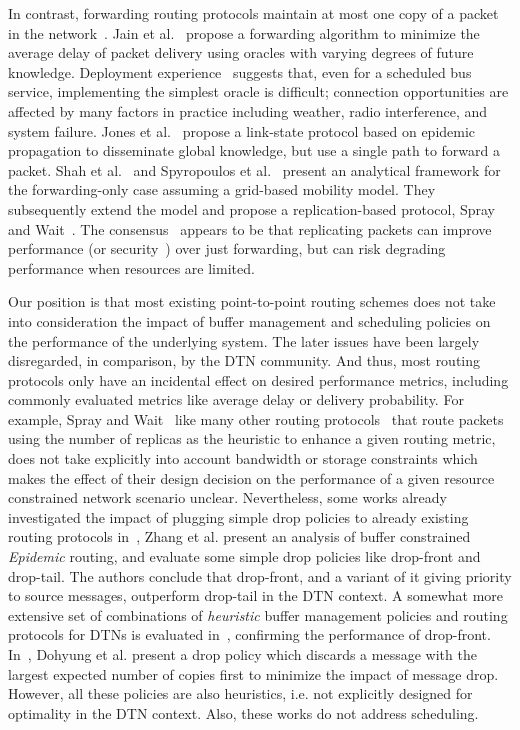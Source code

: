 In contrast, forwarding routing protocols maintain at most one copy of a packet in the network~\cite{Fall:DTNrouting,Waterloo:wdtn,akis:technical1}. Jain et
al.~\cite{Fall:DTNrouting} propose a forwarding algorithm to minimize the average delay of packet delivery using oracles with varying degrees of future knowledge. Deployment experience~\cite{BalasubramanianLV07} suggests that, even for a scheduled bus service, implementing
the simplest oracle is difficult; connection opportunities are affected by many factors in practice including weather, radio
interference, and system failure. Jones et al.~\cite{Waterloo:wdtn} propose a link-state protocol based on
epidemic propagation to disseminate global knowledge, but use a single path to forward a packet. Shah et al.~\cite{Shah:datamules} and
Spyropoulos et al.~\cite{akis:technical1} present an analytical framework for the forwarding-only case assuming a grid-based mobility model. They subsequently extend the model and propose a
replication-based protocol, Spray and Wait~\cite{akis:wdtn}. The consensus~\cite{akis:wdtn} appears to be that replicating packets can improve performance (or security~\cite{Levine:Mobihoc07}) over just forwarding, but can risk degrading performance when resources are limited.

Our position is that most existing point-to-point routing schemes does not take into consideration the impact of buffer management and scheduling policies on the performance of the underlying system. The later issues have been largely disregarded, in comparison, by the DTN community. And thus, most routing protocols only have an incidental effect on desired performance metrics, including commonly evaluated metrics like average delay or delivery probability. For example, Spray and Wait~\cite{akis:wdtn} like many other routing protocols~\cite{Haas:wdtn,Vahdat:epidemic} that route packets using the number of replicas as the heuristic to enhance a given routing metric, does not take explicitly into account bandwidth or storage constraints which makes the effect of their design decision on the performance of a given resource constrained network scenario unclear. Nevertheless, some works already investigated the impact of plugging simple drop policies to already existing routing protocols in~\cite{Towsley:Epidemic}, Zhang et al. present an analysis of buffer constrained \emph{Epidemic} routing, and evaluate some simple drop policies like drop-front and drop-tail. The authors conclude that drop-front, and a variant of it giving priority to source messages, outperform drop-tail in the DTN context. A somewhat more extensive set of combinations of \emph{heuristic} buffer management policies and routing protocols for DTNs is evaluated in~\cite{QueuingPolicies}, confirming the performance of drop-front. In~\cite{DCopies}, Dohyung et al. present a drop policy which discards a message with the largest expected number of copies first to minimize the impact of message drop. However, all these policies are also heuristics, i.e. not explicitly designed for optimality in the DTN context. Also, these works do not address scheduling. 

